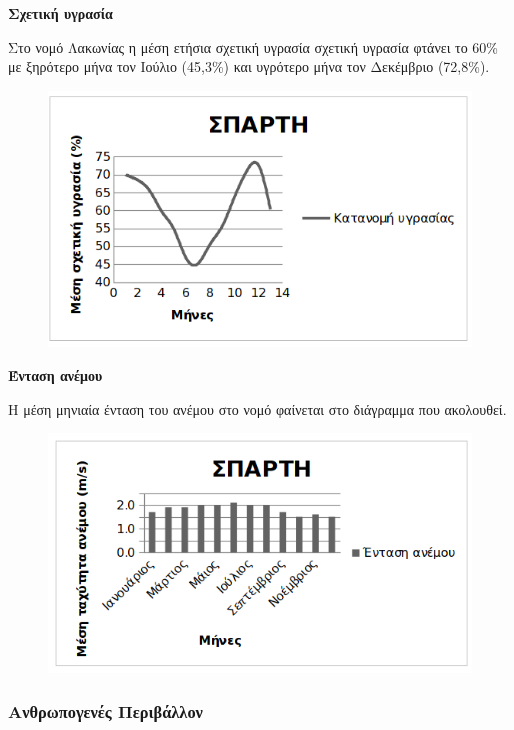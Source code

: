 \documentclass[12pt]{article}
\begin{document}
	\textbf{Σχετική υγρασία}
	
	Στο νομό Λακωνίας η μέση ετήσια σχετική υγρασία σχετική υγρασία φτάνει το 60\% με ξηρότερο μήνα τον Ιούλιο (45,3\%) και υγρότερο μήνα τον Δεκέμβριο (72,8\%).
	
	\begin{figure} [H]
		\begin{center}
			\includegraphics [scale = 0.80] {sparti3.png}
		\end{center}
	\end{figure}

	\textbf{Ένταση ανέμου}
	
	Η μέση μηνιαία ένταση του ανέμου στο νομό φαίνεται στο διάγραμμα που ακολουθεί.
	
	\begin{figure} [H]
		\begin{center}
			\includegraphics [scale = 0.80] {sparti4.png}
		\end{center}
	\end{figure}

	\subsubsection{Ανθρωπογενές Περιβάλλον}
	
\end{document}
